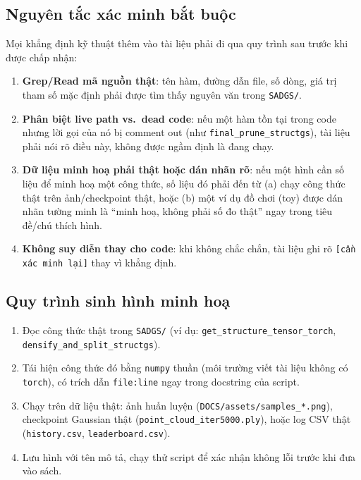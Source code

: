 \documentclass[a4paper,11pt]{article}
\begin{document}
\subsection{Nguyên tắc xác minh bắt buộc}
Mọi khẳng định kỹ thuật thêm vào tài liệu phải đi qua quy trình sau trước khi được chấp nhận:
\begin{enumerate}[leftmargin=1.4em]
    \item \textbf{Grep/Read mã nguồn thật}: tên hàm, đường dẫn file, số dòng, giá trị tham số
    mặc định phải được tìm thấy nguyên văn trong \texttt{SADGS/}.
    \item \textbf{Phân biệt live path vs.\ dead code}: nếu một hàm tồn tại trong code nhưng lời
    gọi của nó bị comment out (như \texttt{final\_prune\_structgs}), tài liệu phải nói rõ điều
    này, không được ngầm định là đang chạy.
    \item \textbf{Dữ liệu minh hoạ phải thật hoặc dán nhãn rõ}: nếu một hình cần số liệu để
    minh hoạ một công thức, số liệu đó phải đến từ (a) chạy công thức thật trên ảnh/checkpoint
    thật, hoặc (b) một ví dụ đồ chơi (toy) được dán nhãn tường minh là ``minh hoạ, không phải
    số đo thật'' ngay trong tiêu đề/chú thích hình.
    \item \textbf{Không suy diễn thay cho code}: khi không chắc chắn, tài liệu ghi rõ
    \texttt{[cần xác minh lại]} thay vì khẳng định.
\end{enumerate}

\subsection{Quy trình sinh hình minh hoạ}
\begin{enumerate}[leftmargin=1.4em]
    \item Đọc công thức thật trong \texttt{SADGS/} (ví dụ: \texttt{get\_structure\_tensor\_torch},
    \texttt{densify\_and\_split\_structgs}).
    \item Tái hiện công thức đó bằng \texttt{numpy} thuần (môi trường viết tài liệu không có
    \texttt{torch}), có trích dẫn \texttt{file:line} ngay trong docstring của script.
    \item Chạy trên dữ liệu thật: ảnh huấn luyện (\texttt{DOCS/assets/samples\_*.png}),
    checkpoint Gaussian thật (\texttt{point\_cloud\_iter5000.ply}), hoặc log CSV thật
    (\texttt{history.csv}, \texttt{leaderboard.csv}).
    \item Lưu hình với tên mô tả, chạy thử script để xác nhận không lỗi trước khi đưa vào sách.
\end{enumerate}
\end{document}
